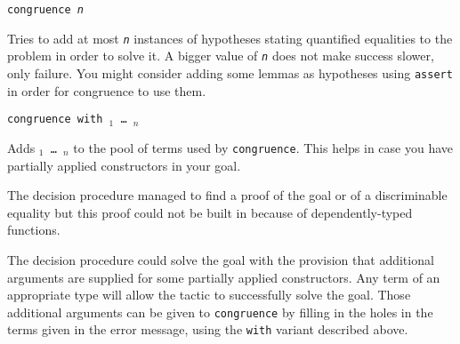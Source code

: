 \begin{coq_example*}
\begin{Variants}
 \item {\tt congruence {\sl n}}

  Tries to add at most {\tt \sl n} instances of hypotheses stating quantified equalities to the problem in order to solve it. A bigger value of {\tt \sl n} does not make success slower, only failure. You might consider adding some lemmas as hypotheses using {\tt assert} in order for congruence to use them.

\item {\tt congruence with \term$_1$ \dots\ \term$_n$}

  Adds {\tt \term$_1$ \dots\ \term$_n$} to the pool of terms used by
  {\tt congruence}. This helps in case you have partially applied
  constructors in your goal.
\end{Variants}

\begin{ErrMsgs}
  \item {}

    The decision procedure managed to find a proof of the goal or of
    a discriminable equality but this proof could not be built in {\Coq}
    because of dependently-typed functions.

  \item {}

    The decision procedure could solve the goal with the provision
    that additional arguments are supplied for some partially applied
    constructors. Any term of an appropriate type will allow the
    tactic to successfully solve the goal. Those additional arguments
    can be given to {\tt congruence} by filling in the holes in the
    terms given in the error message, using the {\tt with} variant
    described above.
\end{ErrMsgs}






































\end{coq_example*}
